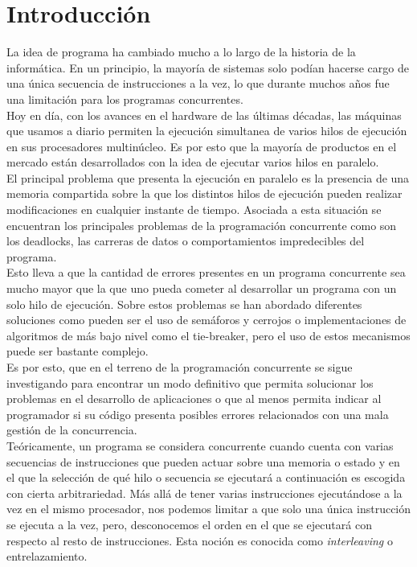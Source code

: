 \chapter{Introducción}
La idea de programa ha cambiado mucho a lo largo de la historia de la informática. En un principio, la mayoría de sistemas solo podían hacerse cargo de una única secuencia de instrucciones a la vez, lo que durante muchos años fue una limitación para los programas concurrentes.\\

Hoy en día, con los avances en el hardware de las últimas décadas, las máquinas que usamos a diario permiten la ejecución simultanea de varios hilos de ejecución en sus procesadores multinúcleo. Es por esto que la mayoría de productos en el mercado están desarrollados con la idea de ejecutar varios hilos en paralelo.\\

El principal problema que presenta la ejecución en paralelo es la presencia de una memoria compartida sobre la que los distintos hilos de ejecución pueden realizar modificaciones en cualquier instante de tiempo. Asociada a esta situación se encuentran los principales problemas de la programación concurrente como son los deadlocks, las carreras de datos o comportamientos impredecibles del programa.\\

Esto lleva a que la cantidad de errores presentes en un programa concurrente sea mucho mayor que la que uno pueda cometer al desarrollar un programa con un solo hilo de ejecución. Sobre estos problemas se han abordado diferentes soluciones como pueden ser el uso de semáforos y cerrojos o implementaciones de algoritmos de más bajo nivel como el tie-breaker, pero el uso de estos mecanismos puede ser bastante complejo.\\

Es por esto, que en el terreno de la programación concurrente se sigue investigando para encontrar un modo definitivo que permita solucionar los problemas en el desarrollo de aplicaciones o que al menos permita indicar al programador si su código presenta posibles errores relacionados con una mala gestión de la concurrencia.\\

Teóricamente, un programa se considera concurrente cuando cuenta con varias secuencias de instrucciones que pueden actuar sobre una memoria o estado y en el que la selección de qué hilo o secuencia se ejecutará a continuación es escogida con cierta arbitrariedad. Más allá de tener varias instrucciones ejecutándose a la vez en el mismo procesador, nos podemos limitar a que solo una única instrucción se ejecuta a la vez, pero, desconocemos el orden en el que se ejecutará con respecto al resto de instrucciones. Esta noción es conocida como \emph{interleaving} o entrelazamiento.\\

